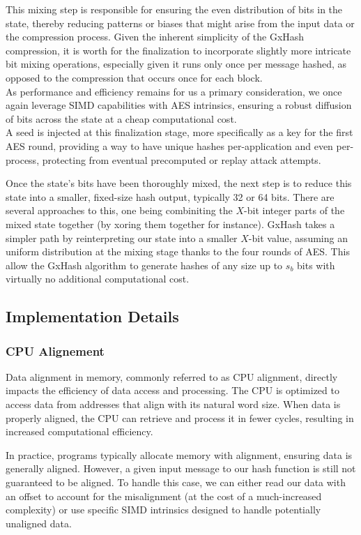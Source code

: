 \documentclass[10pt]{article}
\begin{document}
This mixing step is responsible for ensuring the even distribution of bits in the state, thereby reducing patterns or biases that might arise from the input data or the compression process. Given the inherent simplicity of the GxHash compression, it is worth for the finalization to incorporate slightly more intricate bit mixing operations, especially given it runs only once per message hashed, as opposed to the compression that occurs once for each block.\\
As performance and efficiency remains for us a primary consideration, we once again leverage SIMD capabilities with AES intrinsics, ensuring a robust diffusion of bits across the state at a cheap computational cost.\\
A seed is injected at this finalization stage, more specifically as a key for the first AES round, providing a way to have unique hashes per-application and even per-process, protecting from eventual precomputed or replay attack attempts.

Once the state's bits have been thoroughly mixed, the next step is to reduce this state into a smaller, fixed-size hash output, typically 32 or 64 bits. There are several approaches to this, one being combiniting the \( X \)-bit integer parts of the mixed state together (by xoring them together for instance). GxHash takes a simpler path by reinterpreting our state into a smaller \( X \)-bit value, assuming an uniform distribution at the mixing stage thanks to the four rounds of AES. This allow the GxHash algorithm to generate hashes of any size up to \( s_b \) bits with virtually no additional computational cost.

\subsection{Implementation Details}

\subsubsection{CPU Alignement}

Data alignment in memory, commonly referred to as CPU alignment, directly impacts the efficiency of data access and processing. The CPU is optimized to access data from addresses that align with its natural word size. When data is properly aligned, the CPU can retrieve and process it in fewer cycles, resulting in increased computational efficiency.

In practice, programs typically allocate memory with alignment, ensuring data is generally aligned. However, a given input message to our hash function is still not guaranteed to be aligned. To handle this case, we can either read our data with an offset to account for the misalignment (at the cost of a much-increased complexity) or use specific SIMD intrinsics designed to handle potentially unaligned data. 
\end{document}
